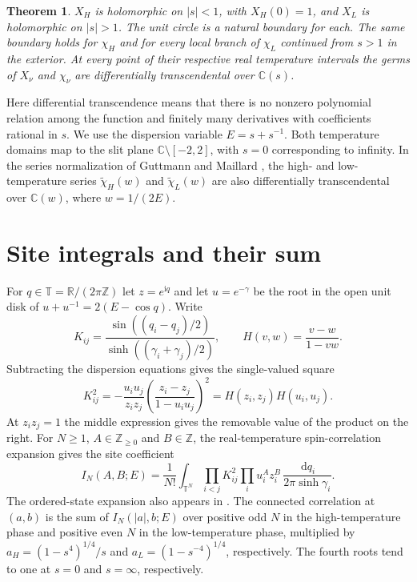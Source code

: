 \documentclass[11pt]{article}
\newtheorem*{theorem}{Theorem}
\newcommand{\ii}{\mathrm i}
\newcommand{\dd}{\,\mathrm d}
\newcommand{\C}{\mathbb C}
\newcommand{\R}{\mathbb R}
\newcommand{\Z}{\mathbb Z}
\newcommand{\T}{\mathbb T}
\begin{document}
\begin{theorem}
$X_H$ is holomorphic on $|s|<1$, with $X_H(0)=1$, and $X_L$ is
holomorphic on $|s|>1$. The unit circle is a natural boundary for
each. The same boundary holds for $\chi_H$ and for every local branch
of $\chi_L$ continued from $s>1$ in the exterior. At every point of
their respective real temperature intervals the germs of $X_\nu$ and
$\chi_\nu$ are differentially transcendental over $\C(s)$.
\end{theorem}

Here differential transcendence means that there is no nonzero
polynomial relation among the function and finitely many derivatives
with coefficients rational in $s$. We use the dispersion variable
$E=s+s^{-1}$. Both temperature domains map to the slit plane
$\C\setminus[-2,2]$, with $s=0$ corresponding to infinity. In the
series normalization of Guttmann and Maillard \cite[(4)--(5)]{GM},
the high- and low-temperature series $\widetilde\chi_H(w)$ and
$\widetilde\chi_L(w)$ are also differentially transcendental over
$\C(w)$, where $w=1/(2E)$.

\section{Site integrals and their sum}

For $q\in\T=\R/(2\pi\Z)$ let $z=e^{\ii q}$ and let $u=e^{-\gamma}$
be the root in the open unit disk of $u+u^{-1}=2(E-\cos q)$.
Write
\[
 K_{ij}=\frac{\sin((q_i-q_j)/2)}{\sinh((\gamma_i+\gamma_j)/2)},
 \qquad H(v,w)=\frac{v-w}{1-vw}.
\]
Subtracting the dispersion equations gives the single-valued square
\begin{equation}\label{pair}
 K_{ij}^2=-\frac{u_i u_j}{z_i z_j}
          \left(\frac{z_i-z_j}{1-u_i u_j}\right)^2
          = H(z_i,z_j)H(u_i,u_j).
\end{equation}
At $z_i z_j=1$ the middle expression gives the removable value of the product on the right.
For $N\ge1$, $A\in\Z_{\ge0}$ and $B\in\Z$, the real-temperature
spin-correlation expansion \cite[(3.13), (3.17)--(3.20), (4.1)--(4.2)]{ONGP}
gives the site coefficient
\begin{equation}\label{site}
 I_N(A,B;E)=\frac1{N!}\int_{\T^N}\prod_{i<j}K_{ij}^2
       \prod_i u_i^A z_i^B\,\frac{\dd q_i}{2\pi\sinh\gamma_i}.
\end{equation}
The ordered-state expansion also appears in \cite[Theorem~5.0]{PT}.
The connected correlation at $(a,b)$ is the sum of
$I_N(|a|,b;E)$ over positive odd $N$ in the high-temperature phase
and positive even $N$ in the low-temperature phase, multiplied by
$a_H=(1-s^4)^{1/4}/s$ and $a_L=(1-s^{-4})^{1/4}$, respectively.
The fourth roots tend to one at $s=0$ and $s=\infty$, respectively.
\end{document}
